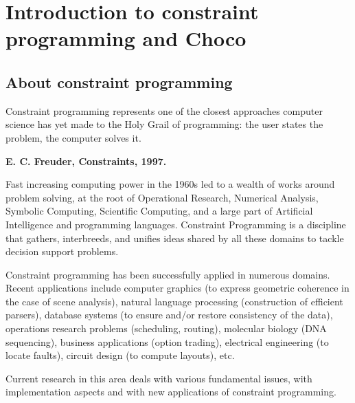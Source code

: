 \chapter{Introduction to constraint programming and Choco}\label{doc:introduction}\hypertarget{doc:introduction}{}

\section{About constraint programming}\label{introduction:aboutconstraintprogramming}\hypertarget{introduction:aboutconstraintprogramming}{}

\begin{myquote}
Constraint programming represents one of the closest approaches computer science has yet made to the Holy Grail of programming: the user states the problem, the computer solves it.
\begin{flushright}\bf E. C. Freuder, Constraints, 1997.\end{flushright}
\end{myquote}


Fast increasing computing power in the 1960s led to a wealth of works around problem solving, at the root of Operational Research, Numerical Analysis, Symbolic Computing, Scientific Computing, and a large part of Artificial Intelligence and programming languages. Constraint Programming is a discipline that gathers, interbreeds, and unifies ideas shared by all these domains to tackle decision support problems.

Constraint programming has been successfully applied in numerous domains. Recent applications include computer graphics (to express geometric coherence in the case of scene analysis), natural language processing (construction of efficient parsers), database systems (to ensure and/or restore consistency of the data), operations research problems (scheduling, routing), molecular biology (DNA sequencing), business applications (option trading), electrical engineering (to locate faults), circuit design (to compute layouts), etc.

Current research in this area deals with various fundamental issues, with implementation aspects and with new applications of constraint programming.

